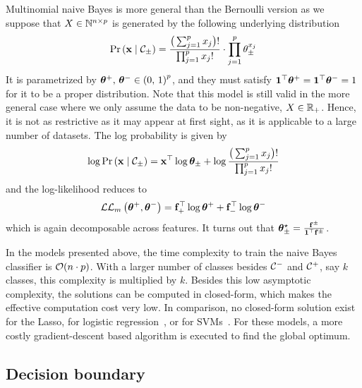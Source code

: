 Multinomial naive Bayes is more general than the Bernoulli version
as we suppose that $X \in \mathbb{N}^{n \times p}$ is generated by the following underlying distribution
\begin{equation*}
        \Pr\left( \mathbf{x} \mid \mathcal{C}_\pm \right) =
                \frac{\big( \sum_{j = 1}^p x_j \big)!}
                        {\prod_{j = 1}^p x_j!} \cdot \prod_{j = 1}^p \theta_\pm^{x_j}
\end{equation*}
It is parametrized by $\bm{\theta}^+,\, \bm{\theta}^- \in \left( 0,\, 1 \right)^p$, and they must satisfy
$\mathbf{1}^\top\bm{\theta}^+ = \mathbf{1}^\top\bm{\theta}^- = 1$ for it to be a proper distribution.
Note that this model is still valid in the more general case
where we only assume the data to be non-negative, $X \in \mathbb{R}_+$.
Hence, it is not as restrictive as it may appear at first sight,
as it is applicable to a large number of datasets.
The log probability is given by
\[
        \log\Pr\left(\mathbf{x} \mid \mathcal{C}_\pm\right) =
                \mathbf{x}^\top\log\bm{\theta}_\pm + \log\frac{\big(\sum_{j = 1}^p x_j\big)!}{\prod_{j = 1}^p x_j!}
\]
and the log-likelihood reduces to
\begin{equation}\label{eq:multinomial_snb_ll}
        \mathcal{L}\mathcal{L}_m\left(\bm{\theta}^+, \bm{\theta}^-\right) = \mathbf{f}_+^\top\log\bm{\theta}^+ + \mathbf{f}_-^\top\log\bm{\theta}^-
\end{equation}
which is again decomposable across features.
It turns out that $\bm{\theta}_\pm^\star = \frac{\mathbf{f}^\pm}{\mathbf{1}^\top\mathbf{f}^\pm}$.

In the models presented above, the time complexity to train the naive Bayes classifier is $\mathcal{O}(n \cdot p)$.
With a larger number of classes besides $\mathcal{C}^-$ and $\mathcal{C}^+$, say $k$ classes, this complexity is multiplied by $k$.
Besides this low asymptotic complexity,
the solutions can be computed in closed-form, which makes the effective computation cost very low.
In comparison, no closed-form solution exist for the Lasso, for logistic regression~\cite{logistic_regression},
or for SVMs~\cite{svm}.
For these models, a more costly gradient-descent based algorithm is executed to find the global optimum.

\subsection{Decision boundary}\label{subsec:nb_bound}


